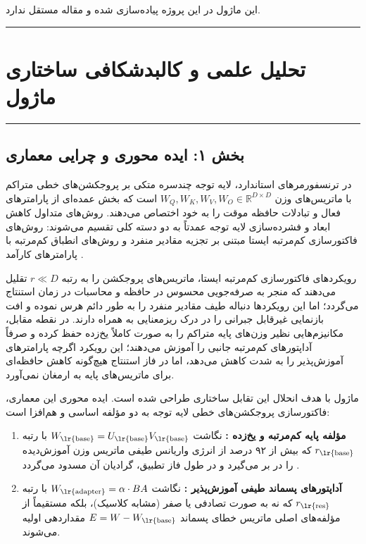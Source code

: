\clearpage
{}
\vspace*{0.2cm}

این ماژول در این پروژه پیاده‌سازی شده و مقاله مستقل ندارد.
\noindent\rule{\textwidth}{1.2pt}
\vspace*{0.1cm}
\section{تحلیل علمی و کالبدشکافی ساختاری ماژول }
\label{sec:mod_res_svd}
\vspace*{-0.2cm}
\noindent\rule{\textwidth}{0.5pt}
\vspace*{0.3cm}

\subsection*{بخش ۱: ایده محوری و چرایی معماری }
در ترنسفورمرهای استاندارد، لایه توجه چندسره  متکی بر پروجکشن‌های خطی متراکم با ماتریس‌های وزن $W_Q, W_K, W_V, W_O \in \mathbb{R}^{D \times D}$ است که بخش عمده‌ای از پارامترهای فعال و تبادلات حافظه موقت را به خود اختصاص می‌دهند. روش‌های متداول کاهش ابعاد و فشرده‌سازی لایه توجه عمدتاً به دو دسته کلی تقسیم می‌شوند: روش‌های فاکتورسازی کم‌مرتبه ایستا مبتنی بر تجزیه مقادیر منفرد  و روش‌های انطباق کم‌مرتبه با پارامترهای کارآمد . 

رویکردهای فاکتورسازی کم‌مرتبه ایستا، ماتریس‌های پروجکشن را به رتبه $r \ll D$ تقلیل می‌دهند که منجر به صرفه‌جویی محسوس در حافظه و محاسبات در زمان استنتاج می‌گردد؛ اما این رویکردها دنباله طیف مقادیر منفرد  را به طور دائم هرس نموده و افت بازنمایی غیرقابل جبرانی را در درک ریزمعنایی به همراه دارند. در نقطه مقابل، مکانیزم‌هایی نظیر  وزن‌های پایه متراکم را به صورت کاملاً یخ‌زده حفظ کرده و صرفاً آداپتورهای کم‌مرتبه جانبی را آموزش می‌دهند؛ این رویکرد اگرچه پارامترهای آموزش‌پذیر را به شدت کاهش می‌دهد، اما در فاز استنتاج هیچ‌گونه کاهش حافظه‌ای برای ماتریس‌های پایه به ارمغان نمی‌آورد.

ماژول  با هدف انحلال این تقابل ساختاری طراحی شده است. ایده محوری این معماری، فاکتورسازی پروجکشن‌های خطی لایه توجه به دو مؤلفه اساسی و هم‌افزا است:
\begin{enumerate}
    \item \textbf{مؤلفه پایه کم‌مرتبه و یخ‌زده :} نگاشت $W_{\text{\lr{base}}} = U_{\text{\lr{base}}} V_{\text{\lr{base}}}$ با رتبه $r_{\text{\lr{base}}}$ که بیش از ۹۲ درصد از انرژی واریانس طیفی ماتریس وزن آموزش‌دیده را در بر می‌گیرد و در طول فاز تطبیق، گرادیان آن مسدود می‌گردد .
    \item \textbf{آداپتورهای پسماند طیفی آموزش‌پذیر :} نگاشت $W_{\text{\lr{adapter}}} = \alpha \cdot B A$ با رتبه $r_{\text{\lr{res}}}$ که نه به صورت تصادفی یا صفر (مشابه  کلاسیک)، بلکه مستقیماً از مؤلفه‌های اصلی ماتریس خطای پسماند $E = W - W_{\text{\lr{base}}}$ مقداردهی اولیه می‌شوند.
\end{enumerate}

